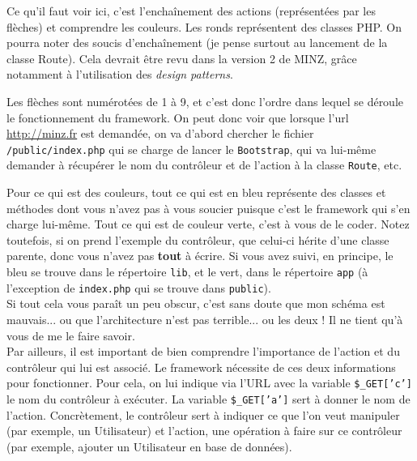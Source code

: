 \documentclass[a4paper,11pt]{article}
\begin{document}
Ce qu'il faut voir ici, c'est l'enchaînement des actions (représentées par les flèches) et comprendre les couleurs. Les ronds représentent des classes PHP. On pourra noter des soucis d'enchaînement (je pense surtout au lancement de la classe Route). Cela devrait être revu dans la version 2 de MINZ, grâce notamment à l'utilisation des \textit{design patterns}.

Les flèches sont numérotées de 1 à 9, et c'est donc l'ordre dans lequel se déroule le fonctionnement du framework. On peut donc voir que lorsque l'url \url{http://minz.fr} est demandée, on va d'abord chercher le fichier \texttt{/public/index.php} qui se charge de lancer le \texttt{Bootstrap}, qui va lui-même demander à récupérer le nom du contrôleur et de l'action à la classe \texttt{Route}, etc.

Pour ce qui est des couleurs, tout ce qui est en bleu représente des classes et méthodes dont vous n'avez pas à vous soucier puisque c'est le framework qui s'en charge lui-même. Tout ce qui est de couleur verte, c'est à vous de le coder. Notez toutefois, si on prend l'exemple du contrôleur, que celui-ci hérite d'une classe parente, donc vous n'avez pas \textbf{tout} à écrire. Si vous avez suivi, en principe, le bleu se trouve dans le répertoire \texttt{lib}, et le vert, dans le répertoire \texttt{app} (à l'exception de \texttt{index.php} qui se trouve dans \texttt{public}).\\

Si tout cela vous paraît un peu obscur, c'est sans doute que mon schéma est mauvais... ou que l'architecture n'est pas terrible... ou les deux ! Il ne tient qu'à vous de me le faire savoir.\\

Par ailleurs, il est important de bien comprendre l'importance de l'action et du contrôleur qui lui est associé. Le framework nécessite de ces deux informations pour fonctionner. Pour cela, on lui indique via l'URL avec la variable \texttt{\$\_GET['c']} le nom du contrôleur à exécuter. La variable \texttt{\$\_GET['a']} sert à donner le nom de l'action. Concrètement, le contrôleur sert à indiquer ce que l'on veut manipuler (par exemple, un Utilisateur) et l'action, une opération à faire sur ce contrôleur (par exemple, ajouter un Utilisateur en base de données).
\end{document}
